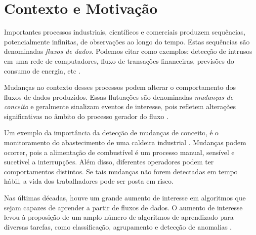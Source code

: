 \documentclass[qual, classic, a4paper]{ufbathesis}
\begin{document}
\tableofcontents

\listoffigures

\listoftables

\mainmatter

% 
% 
% 
%

 \label{introducao}

\section{Contexto e Motivação}

Importantes processos industriais, científicos e comerciais produzem sequências, potencialmente infinitas, de observações ao longo do tempo. Estas sequências são denominadas \textit{fluxos de dados}. 
Podemos citar como exemplos:  detecção de intrusos em uma
rede de computadores, fluxo de transações financeiras, previsões do consumo de energia, etc \cite{Aggarwal:2003:FCE:1315451.1315460}.

Mudanças no contexto desses processos podem alterar o comportamento dos fluxos de dados produzidos. 
Essas flutuações são denominadas \textit{mudanças de conceito} e geralmente sinalizam eventos de interesse, pois refletem alterações significativas no âmbito do processo gerador do fluxo \cite{Gama:2014:SCD:2597757.2523813}. 

Um exemplo da importância da detecção de mudanças de conceito, é o monitoramento do abastecimento de uma caldeira industrial \cite{6294406}.
Mudanças podem ocorrer, pois a alimentação de combustível é um processo manual, sensível e sucetível a interrupções. 
Além disso, diferentes operadores podem ter comportamentos distintos.
Se tais mudanças não forem detectadas em tempo hábil, a vida dos trabalhadores pode ser posta em risco.

Nas últimas décadas, houve um grande aumento de interesse em algoritmos que sejam
capazes de aprender a partir de fluxos de dados. O aumento de interesse levou à proposição de um amplo número de algoritmos de aprendizado para diversas tarefas, como classificação, agrupamento e detecção de anomalias \cite{Gama:2014:SCD:2597757.2523813, Guha:2003:CDS:776752.776777}.
\end{document}

